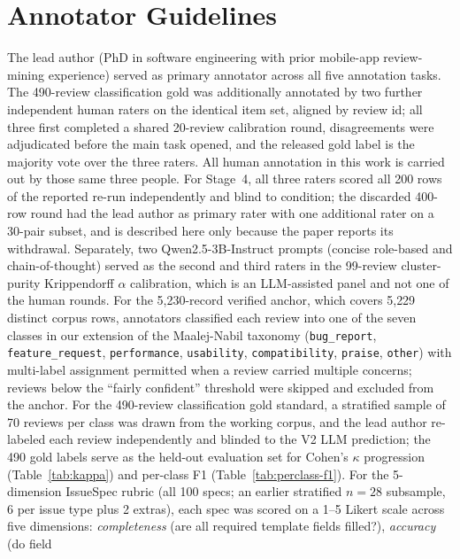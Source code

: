 \documentclass[11pt]{article}
\begin{document}
\section{Annotator Guidelines}\label{appendix:annotators}

  The lead author (PhD in software engineering with prior mobile-app review-mining experience)
  served as primary annotator across all five annotation tasks. The 490-review classification
  gold was additionally annotated by two further independent human raters on the identical item
  set, aligned by review id; all three first completed a shared 20-review calibration round,
  disagreements were adjudicated before the main task opened, and the released gold label is the
  majority vote over the three raters. All human annotation in this work is carried out by
  those same three people. For Stage~4, all three raters scored all 200 rows of the reported
  re-run independently and blind to condition; the discarded 400-row round had the lead author as
  primary rater with one additional rater on a 30-pair subset, and is described here only because
  the paper reports its withdrawal. Separately, two Qwen2.5-3B-Instruct prompts (concise
  role-based and chain-of-thought) served as the second and third raters in the 99-review
  cluster-purity Krippendorff $\alpha$ calibration, which is an LLM-assisted panel and not one of
  the human rounds. For the 5{,}230-record verified anchor, which covers 5{,}229 distinct corpus rows, annotators classified each review into
  one of the seven classes in our extension of the Maalej-Nabil taxonomy (\texttt{bug\_report}, \texttt{feature\_request},
  \texttt{performance}, \texttt{usability}, \texttt{compatibility}, \texttt{praise},
  \texttt{other}) with multi-label assignment permitted when a review carried multiple concerns;
   reviews below the ``fairly confident'' threshold were skipped and excluded from the anchor.
  For the 490-review classification gold standard, a stratified sample of 70 reviews per class
  was drawn from the working corpus, and the lead author re-labeled each review independently
  and blinded to the V2 LLM prediction; the 490 gold labels serve as the held-out evaluation set
   for Cohen's $\kappa$ progression (Table~\ref{tab:kappa}) and per-class F1
  (Table~\ref{tab:perclass-f1}). For the 5-dimension IssueSpec rubric (all 100 specs; an earlier stratified $n=28$ subsample, 6 per issue
   type plus 2 extras), each spec was scored on a 1--5 Likert scale across five dimensions:
  \emph{completeness} (are all required template fields filled?), \emph{accuracy} (do field
\end{document}
